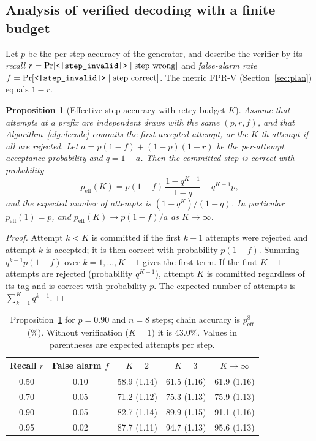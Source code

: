\documentclass[11pt, a4paper]{article}
\newtheorem{proposition}{Proposition}
\newcommand{\invalid}{\texttt{<|step\_\allowbreak invalid|>}}
\begin{document}
\subsection{Analysis of verified decoding with a finite budget}
\label{sec:analysis}
Let $p$ be the per-step accuracy of the generator, and describe the verifier by its \emph{recall} $r=\Pr[\invalid\mid\text{step wrong}]$ and \emph{false-alarm rate} $f=\Pr[\invalid\mid\text{step correct}]$. The metric FPR-V (Section~\ref{sec:plan}) equals $1-r$.

\begin{proposition}[Effective step accuracy with retry budget $K$]
\label{prop:eff}
Assume that attempts at a prefix are independent draws with the same $(p,r,f)$, and that Algorithm~\ref{alg:decode} commits the first accepted attempt, or the $K$-th attempt if all are rejected. Let $a=p(1-f)+(1-p)(1-r)$ be the per-attempt acceptance probability and $q=1-a$. Then the committed step is correct with probability
\begin{equation}
p_{\text{eff}}(K)=p(1-f)\,\frac{1-q^{K-1}}{1-q}+q^{K-1}p,
\label{eq:peff}
\end{equation}
and the expected number of attempts is $(1-q^{K})/(1-q)$. In particular $p_{\text{eff}}(1)=p$, and $p_{\text{eff}}(K)\to p(1-f)/a$ as $K\to\infty$.
\end{proposition}
\begin{proof}
Attempt $k<K$ is committed if the first $k-1$ attempts were rejected and attempt $k$ is accepted; it is then correct with probability $p(1-f)$. Summing $q^{k-1}p(1-f)$ over $k=1,\dots,K-1$ gives the first term. If the first $K-1$ attempts are rejected (probability $q^{K-1}$), attempt $K$ is committed regardless of its tag and is correct with probability $p$. The expected number of attempts is $\sum_{k=1}^{K}q^{k-1}$.
\end{proof}

\begin{table}[t]
\centering
\caption{Proposition~\ref{prop:eff} for $p=0.90$ and $n=8$ steps; chain accuracy is $p_{\text{eff}}^{8}$ (\%). Without verification ($K=1$) it is 43.0\%. Values in parentheses are expected attempts per step.}
\label{tab:analytic}
\small
\begin{tabular}{ccccc}
\toprule
Recall $r$ & False alarm $f$ & $K=2$ & $K=3$ & $K\to\infty$ \\
\midrule
0.50 & 0.10 & 58.9 (1.14) & 61.5 (1.16) & 61.9 (1.16) \\
0.70 & 0.05 & 71.2 (1.12) & 75.3 (1.13) & 75.9 (1.13) \\
0.90 & 0.05 & 82.7 (1.14) & 89.9 (1.15) & 91.1 (1.16) \\
0.95 & 0.02 & 87.7 (1.11) & 94.7 (1.13) & 95.6 (1.13) \\
\bottomrule
\end{tabular}
\end{table}
\end{document}
